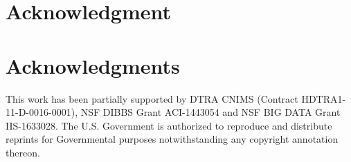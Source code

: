\documentclass[10pt,journal,compsoc]{IEEEtran}
\begin{document}
% 
% 
% 
% 








\iffalse
\ifCLASSOPTIONcompsoc
  \section*{Acknowledgments}
\else
  \section*{Acknowledgment}
\fi
\fi

\section*{Acknowledgments}
This work has been partially supported by
DTRA CNIMS (Contract HDTRA1-11-D-0016-0001),
NSF DIBBS Grant ACI-1443054 and
NSF BIG DATA Grant IIS-1633028.
The U.S. Government is authorized to reproduce and
distribute reprints for Governmental purposes notwithstanding
any copyright annotation thereon.
\end{document}
